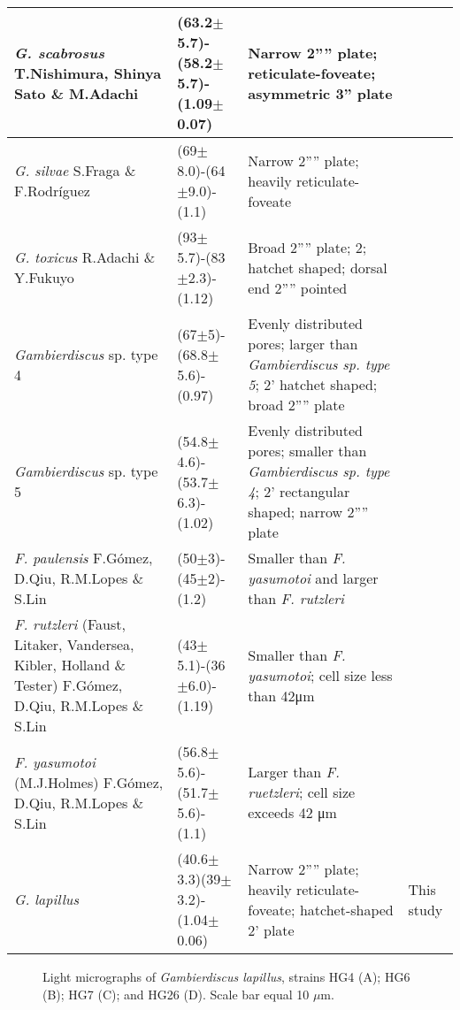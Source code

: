 \documentclass[12pt]{article}
\begin{document}
\begin{longtable}{ | p{5cm} | p{2cm} | p{6cm} | p{2cm} |}
 \hline
\textit{G. scabrosus} T.Nishimura, Shinya Sato \& M.Adachi	& (63.2$\pm$5.7)-(58.2$\pm$5.7)-(1.09$\pm$0.07) & Narrow 2'''' plate; reticulate-foveate; asymmetric 3” plate & \citep{nishimura2014morphology,nishimura2013genetic,kuno2010genetic}  \\
 \hline
 \textit{G. silvae}	S.Fraga \& F.Rodr{\'i}guez & (69$\pm$8.0)-(64$\pm$9.0)-(1.1) & Narrow 2'''' plate; heavily reticulate-foveate & \citep{fraga2014genus,litaker2010global} \\
 \hline
\textit{G. toxicus} R.Adachi \& Y.Fukuyo & (93$\pm$5.7)-(83$\pm$2.3)-(1.12) & Broad 2'''' plate; 2; hatchet shaped; dorsal end 2'''' pointed & \citep{litaker2009taxonomy,adachi1979thecal,chinain1997intraspecific,richlen2008phylogeography}\\
 \hline
 \emph{Gambierdiscus} sp. type 4	& (67$\pm$5)-(68.8$\pm$5.6)-(0.97) & Evenly distributed pores; larger than \textit{Gambierdiscus sp. type 5}; 2’ hatchet shaped; broad 2'''' plate 
 & \citep{xu2014distribution}\\
 \hline
 \emph{Gambierdiscus} sp. type 5 & (54.8$\pm$4.6)-(53.7$\pm$6.3)-(1.02) & Evenly distributed pores; smaller than \textit{Gambierdiscus sp. type 4}; 2’ rectangular shaped; narrow 2'''' plate &  \citep{xu2014distribution} \\
 \hline
 \textit{F. paulensis} F.Gómez, D.Qiu, R.M.Lopes \& S.Lin & (50$\pm$3)-(45$\pm$2)-(1.2) & Smaller than \textit{F. yasumotoi} and larger than \textit{F. rutzleri} & \citep{gomez2015fukuyoa} \\
 \hline
\textit{F. rutzleri }(Faust, Litaker, Vandersea, Kibler, Holland \& Tester) F.Gómez, D.Qiu, R.M.Lopes \& S.Lin& (43$\pm$5.1)-(36$\pm$6.0)-(1.19) & Smaller than \textit{F. yasumotoi}; cell size less than 42μm &  \citep{litaker2009taxonomy}\\
 \hline
\textit{F. yasumotoi }(M.J.Holmes) F.Gómez, D.Qiu, R.M.Lopes \& S.Lin& (56.8$\pm$5.6)-(51.7$\pm$5.6)-(1.1) & Larger than \textit{F. ruetzleri}; cell size exceeds 42 μm & \citep{litaker2009taxonomy,holmes1998gambierdiscus}  \\
 \hline
\textit{G. lapillus}  & (40.6$\pm$3.3)(39$\pm$3.2)-(1.04$\pm$0.06) & Narrow 2'''' plate; heavily reticulate-foveate; hatchet-shaped 2' plate & This study\\
   \hline
\end{longtable}
\FloatBarrier

\FloatBarrier 
\begin{figure} 
\caption{Light micrographs of \emph{Gambierdiscus lapillus}, strains HG4 (A); HG6 (B); HG7 (C); and HG26 (D). Scale bar equal 10 $\mu$m.​} 
\label{fig:PetLM}
\end{figure} 
\end{document}
